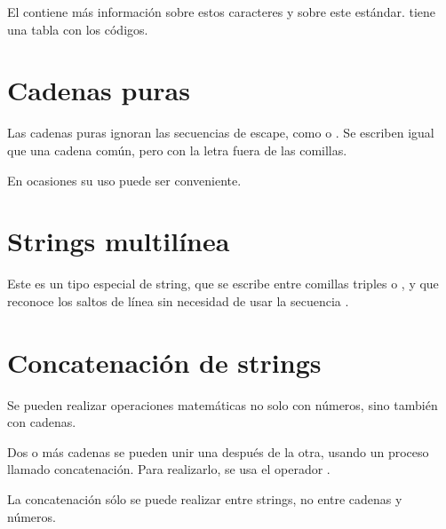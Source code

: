 
El  contiene más información sobre estos caracteres y sobre este estándar.
 tiene una tabla con los códigos.

\section{Cadenas puras}

Las cadenas puras  ignoran las secuencias de escape, como  o .
Se escriben igual que una cadena común, pero con la letra  fuera de las comillas.


En ocasiones su uso puede ser conveniente.

\section{Strings multilínea}

Este es un tipo especial de string, que se escribe entre comillas triples \ttt{\q\q\q \q\q\q} o \ttt{\qq\qq\qq \qq\qq\qq}, y que reconoce los saltos de línea sin necesidad de usar la secuencia .


\section{Concatenación de strings}

Se pueden realizar operaciones matemáticas no solo con números, sino también con cadenas.

Dos o más cadenas se pueden unir una después de la otra, usando un proceso llamado concatenación.
Para realizarlo, se usa el operador \ttt{+}.


La concatenación sólo se puede realizar entre strings, no entre cadenas y números.


